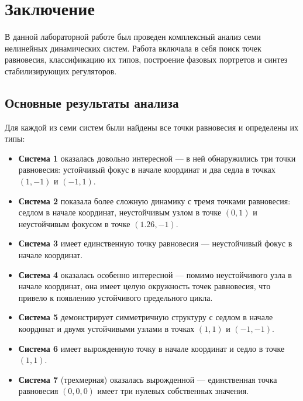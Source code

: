 \section*{Заключение}

В данной лабораторной работе был проведен комплексный анализ семи нелинейных динамических систем. Работа включала в себя поиск точек равновесия, классификацию их типов, построение фазовых портретов и синтез стабилизирующих регуляторов.

\subsection*{Основные результаты анализа}

Для каждой из семи систем были найдены все точки равновесия и определены их типы:

\begin{itemize}
\item \textbf{Система 1} оказалась довольно интересной --- в ней обнаружились три точки равновесия: устойчивый фокус в начале координат и два седла в точках $(1,-1)$ и $(-1,1)$.

\item \textbf{Система 2} показала более сложную динамику с тремя точками равновесия: седлом в начале координат, неустойчивым узлом в точке $(0,1)$ и неустойчивым фокусом в точке $(1.26,-1)$.

\item \textbf{Система 3} имеет единственную точку равновесия --- неустойчивый фокус в начале координат.

\item \textbf{Система 4} оказалась особенно интересной --- помимо неустойчивого узла в начале координат, она имеет целую окружность точек равновесия, что привело к появлению устойчивого предельного цикла.

\item \textbf{Система 5} демонстрирует симметричную структуру с седлом в начале координат и двумя устойчивыми узлами в точках $(1,1)$ и $(-1,-1)$.

\item \textbf{Система 6} имеет вырожденную точку в начале координат и седло в точке $(1,1)$.

\item \textbf{Система 7} (трехмерная) оказалась вырожденной --- единственная точка равновесия $(0,0,0)$ имеет три нулевых собственных значения.
\end{itemize}

